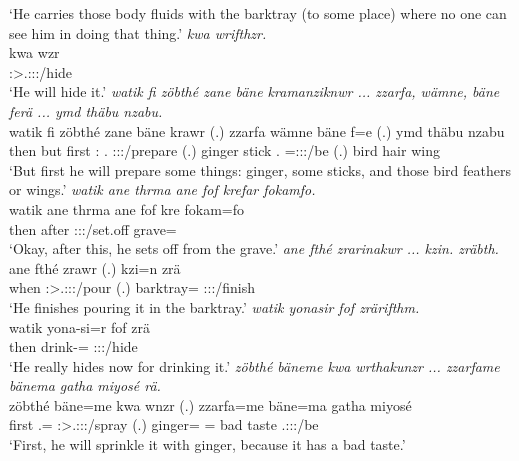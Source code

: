 \begin{exe}
	\trans `He carries those body fluids with the barktray (to some place) where no one can see him in doing that thing.'
	\emph{kwa wrifthzr.}\\
	\gll kwa wzr\\
	{\Fut} \Stsg:\Sbj>\Tsg.\F:\Obj:\Nonpast:\Ipfv/hide\\
	\trans `He will hide it.'
	\emph{watik fi zöbthé zane bäne kramanziknwr ... zzarfa, wämne, bäne ferä ... ymd thäbu nzabu.}\\
	\gll watik fi zöbthé zane bäne krawr (.) zzarfa wämne bäne f=e (.) ymd thäbu nzabu\\
	then but first \Dem:{\Prox} \Recog.{\Abs} \Stsg:\Sbj:\Irr:\Ipfv/prepare (.) ginger stick \Recog.{\Abs} \Dist=\Stpl:\Sbj:\Nonpast:\Ipfv/be (.) bird hair wing\\
	\trans `But first he will prepare some things: ginger, some sticks, and those bird feathers or wings.'
\newpage 	
{}
	\emph{watik ane thrma ane fof krefar fokamfo.}\\
	\gll watik ane thrma ane fof kre fokam=fo\\
	then {\Dem} after {\Dem} {\Emph} \Stsg:\Sbj:\Irr:\Pfv/set.off grave=\All\\
	\trans `Okay, after this, he sets off from the grave.'
	\emph{ane fthé zrarinakwr ... kzin. zräbth.}\\
	\gll ane fthé zrawr (.) kzi=n zrä\\
	{\Dem} when \Stsg:\Sbj>\Tsg.\F:\Obj:\Irr:\Ipfv/pour (.) barktray={\Loc} \Stsg:\Sbj:\Irr:\Pfv/finish\\
	\trans `He finishes pouring it in the barktray.'
	\emph{watik yonasir fof zrärifthm.}\\
	\gll watik yona-si=r fof zrä\\
	then drink-\Nmlz={\Purp} {\Emph} \Stsg:\Sg:\Irr:\Pfv/hide\\
	\trans `He really hides now for drinking it.'
	\emph{zöbthé bäneme kwa wrthakunzr ... zzarfame bänema gatha miyosé rä.}\\
	\gll zöbthé bäne=me kwa wnzr (.) zzarfa=me bäne=ma gatha miyosé \\
	first \Recog.={\Ins} {\Fut} \Stsg:\Sbj>\Tsg.\F:\Obj:\Nonpast:\Ipfv/spray (.) ginger={\Ins} \Recog={\Char} bad taste \Tsg.\F:\Sbj:\Nonpast:\Ipfv/be\\
	\trans `First, he will sprinkle it with ginger, because it has a bad taste.'

\end{exe}
